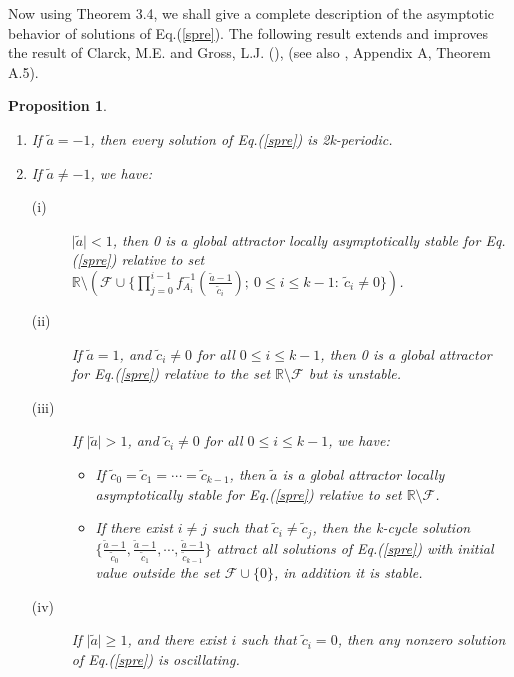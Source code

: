 \documentclass[11pt]{amsart}
\newtheorem{prop}[thm]{Proposition}
\theoremstyle{definition}
\theoremstyle{remark}
\theoremstyle{example}
\numberwithin{equation}{section}
\begin{document}
Now using Theorem 3.4, we shall give a complete description of the asymptotic behavior of solutions of Eq.(\ref{spre}). The following result extends and improves the result of Clarck, M.E. and Gross, L.J. (\cite{8}), (see also \cite{5}, Appendix A, Theorem A.5).
\begin{prop} \rm{
\noindent
\begin{enumerate}[leftmargin=*]
\item If $\tilde{a}=-1$, then every solution of Eq.(\ref{spre}) is 2k-periodic.
\vspace{3mm}
\item If $\tilde{a}\neq-1$, we have:
\vspace{3mm}
\begin{description}
\item[(i)] $\mid\tilde{a}\mid<1$, then 0 is a global attractor locally asymptotically stable for Eq.(\ref{spre}) relative to set\\
 $\mathbb{R}\setminus(\mathcal{F}\cup\{\prod_{j=0}^{i-1}f_{A_i}^{-1}
 (\frac{\tilde{a}-1}{\tilde{c}_i}); \ 0\leq i\leq k-1: \ \tilde{c}_i\neq0\})$.
\vspace{3mm}
\item[(ii)] If $\tilde{a}=1$, and $\tilde{c}_i\neq0$ for all $0\leq i\leq k-1$, then 0 is a global attractor for Eq.(\ref{spre}) relative to the set $\mathbb{R}\setminus\mathcal{F}$ but is unstable.
\vspace{3mm}
\item[(iii)] If $\mid\tilde{a}\mid>1$, and $\tilde{c}_i\neq0$ for all $0\leq i\leq k-1$, we have:
\vspace{3mm}
\begin{itemize}
\item If $\tilde{c}_0=\tilde{c}_1=\cdots=\tilde{c}_{k-1}$, then $\tilde{a}$ is a global attractor locally asymptotically stable for Eq.(\ref{spre}) relative to set
 $\mathbb{R}\setminus\mathcal{F}$.
\vspace{3mm}
\item If there exist $i\neq j$ such that $\tilde{c}_i\neq\tilde{c}_j$, then the k-cycle solution $\{\frac{\tilde{a}-1}{\tilde{c}_0},\frac{\tilde{a}-1}{\tilde{c}_1},
    \cdots,\frac{\tilde{a}-1}{\tilde{c}_{k-1}}\}$ attract
 all solutions of Eq.(\ref{spre}) with initial value outside the set
 $\mathcal{F}\cup\{0\}$, in addition it is stable.
\end{itemize}
\item[(iv)] If $\mid\tilde{a}\mid\geq1$, and there exist $i$ such that $\tilde{c}_i=0$, then any nonzero solution of Eq.(\ref{spre}) is oscillating.
\end{description}
\end{enumerate}
}\end{prop}
\end{document}
